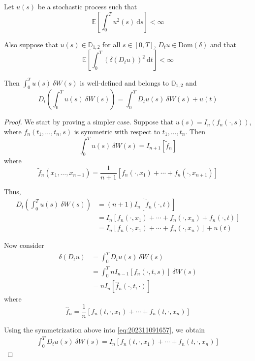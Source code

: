 \begin{theorem}
	Let $u(s)$ be a stochastic process such that $$\mathbb{E}\left[ \int_0^T u^2(s) ~\mathrm{d}s \right] < \infty$$

	Also suppose that $u(s) \in \mathbb{D}_{1,2}$ for all $s \in [0,T]$, $D_t u \in \text{Dom}(\delta)$ and that $$\mathbb{E}\left[ \int_0^T (\delta(D_tu))^2 ~\mathrm{d}t \right] < \infty$$

	Then $\int_0^T u(s)~\delta W(s)$ is well-defined and belongs to $\mathbb{D}_{1,2}$ and 
	$$
	D_t \left( \int_0^T u(s)~\delta W(s) \right) = \int_0^T D_t u(s) ~\delta W(s) + u(t)
	$$
\end{theorem}

\begin{proof}
	We start by proving a simpler case. Suppose that $u(s) = I_n(f_n(\cdot, s))$, where $f_n(t_1, \ldots, t_n, s)$ is symmetric with respect to $t_1, \ldots, t_n$. Then 
	$$
	\int_0^T u(s) ~\delta W(s) = I_{n+1}[\tilde{f}_n]
	$$
	where 
	$$
	\tilde{f}_n(x_1, \ldots, x_{n+1}) = \frac{1}{n+1} \left[ f_n(\cdot, x_1) + \cdots + f_n(\cdot, x_{n+1}) \right]
	$$

	Thus,
	\begin{equation}\label{eq:202311091655}
	\begin{aligned}
		D_t \left( \int_0^T u(s) ~\delta W(s) \right) &= (n+1) I_n[\tilde{f}_n (\cdot, t)] \\
							      &= I_n \left[ f_n(\cdot, x_1) + \cdots + f_n(\cdot, x_n) + f_n(\cdot, t) \right] \\
							      &= I_n \left[ f_n(\cdot, x_1) + \cdots + f_n(\cdot, x_n) \right] + u(t)
	\end{aligned}
	\end{equation}

	Now consider 
	\begin{equation}\label{eq:202311091657}
	\begin{aligned}
	\delta(D_t u) &= \int_0^T D_t u(s) ~\delta W(s) \\
		      &= \int_0^T n I_{n-1}[f_n(\cdot, t, s)]~\delta W(s) \\
		      &= n I_n[\hat{f}_n(\cdot, t, \cdot)]
	\end{aligned}
	\end{equation}
	where
	$$
	\hat{f}_n = \frac{1}{n} \left[ f_n(t, \cdot, x_1) + \cdots + f_n(t, \cdot, x_n) \right]
	$$

	Using the symmetrization above into \eqref{eq:202311091657}, we obtain
	\begin{equation}\label{eq:202311091700}
	\begin{aligned}
	\int_0^T D_t u(s) ~\delta W(s) = I_n \left[ f_n(t, \cdot, x_1) + \cdots + f_n(t, \cdot, x_n) \right] 
	\end{aligned}
	\end{equation}


\end{proof}
